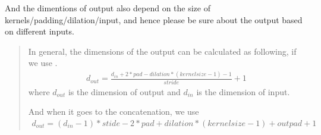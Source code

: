 \documentclass[letterpaper,10pt,english]{sphinxmanual}
\begin{document}
And the dimentions of output also depend on the size of kernels/padding/dilation/input, and hence please be sure about the output based on different inputs.
\begin{quote}

In general, the dimensions of the output can be calculated as following, if we use .
\begin{equation*}
\begin{split}d_{out} = \frac{d_{in} + 2*pad - dilation *(kernelsize -1) - 1}{stride} +1\end{split}
\end{equation*}
where \(d_{out}\) is the dimension of output and \(d_{in}\) is the dimension of input.

And when it goes to the concatenation, we use 
\begin{equation*}
\begin{split}d_{out} = (d_{in}-1)*stide - 2*pad + dilation *(kernelsize -1) + outpad +1\end{split}
\end{equation*}\end{quote}
\end{document}
